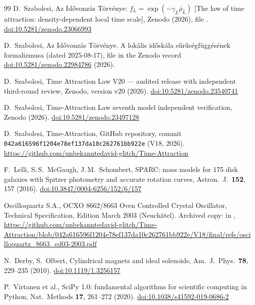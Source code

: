 \documentclass[12pt,a4paper]{article}
\begin{document}
\begin{thebibliography}{99}
D.\ Szabolcsi, Az Id\H{o}vonz\'as T\"orv\'enye: $f_L=\exp(-\gamma_L\bar\rho_L)$ [The law of time attraction:
density-dependent local time scale], Zenodo (2026), file .
\href{https://doi.org/10.5281/zenodo.23066993}{doi:10.5281/zenodo.23066993}

D.\ Szabolcsi, Az Id\H{o}vonz\'as T\"orv\'enye. A lok\'alis id\H{o}sk\'ala s\H{u}r\H{u}s\'egf\"ugg\'es\'enek
formalizmusa (dated 2025-08-17), file  in the Zenodo record
\href{https://doi.org/10.5281/zenodo.22984786}{doi:10.5281/zenodo.22984786} (2026).

D.\ Szabolcsi, Time Attraction Law V20 --- audited release with independent third-round review, Zenodo, version v20 (2026).
\href{https://doi.org/10.5281/zenodo.23540741}{doi:10.5281/zenodo.23540741}

D.\ Szabolcsi, Time-Attraction Law seventh model independent verification, Zenodo (2026).
\href{https://doi.org/10.5281/zenodo.23497128}{doi:10.5281/zenodo.23497128}

D.\ Szabolcsi, Time-Attraction, GitHub repository, commit \texttt{042a616596f1204e78ef137da10c262761bb922e} (V18, 2026).
\url{https://github.com/unbekanntedavid-glitch/Time-Attraction}

F.\ Lelli, S.\,S.\ McGaugh, J.\,M.\ Schombert, SPARC: mass models for 175 disk galaxies with Spitzer photometry and
accurate rotation curves, Astron.\ J.\ \textbf{152}, 157 (2016).
\href{https://doi.org/10.3847/0004-6256/152/6/157}{doi:10.3847/0004-6256/152/6/157}

Oscilloquartz S.A., OCXO 8662/8663 Oven Controlled Crystal Oscillator, Technical Specification, Edition March 2003
(Neuch\^atel). Archived copy:  in \cite{TAL_repo},
\url{https://github.com/unbekanntedavid-glitch/Time-Attraction/blob/042a616596f1204e78ef137da10c262761bb922e/V18/final/refs/oscilloquartz_8663_ed03-2003.pdf}

N.\ Derby, S.\ Olbert, Cylindrical magnets and ideal solenoids, Am.\ J.\ Phys.\ \textbf{78}, 229--235 (2010).
\href{https://doi.org/10.1119/1.3256157}{doi:10.1119/1.3256157}

P.\ Virtanen et al., SciPy 1.0: fundamental algorithms for scientific computing in Python,
Nat.\ Methods \textbf{17}, 261--272 (2020).
\href{https://doi.org/10.1038/s41592-019-0686-2}{doi:10.1038/s41592-019-0686-2}


\end{thebibliography}
\end{document}
